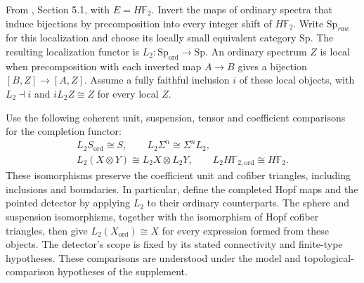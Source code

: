 \begin{definition}
\label{sem:AdamsSynthetic:completed-background}
\label{sem:AdamsSynthetic:completion-comparisons}
From \cite{Pst}, Section 5.1, with $E=H\mathbb F_2$. Invert the maps
of ordinary spectra that induce bijections by precomposition into every
integer shift of $H\mathbb F_2$. Write $\mathrm{Sp}_{raw}$ for this
localization and choose its locally small equivalent category
$\mathrm{Sp}$. The resulting localization functor is
$L_2:\mathrm{Sp}_{\mathrm{ord}}\to\mathrm{Sp}$.
An ordinary spectrum $Z$ is local when precomposition with each
inverted map $A\to B$ gives a bijection $[B,Z]\to[A,Z]$.
Assume a fully faithful inclusion $i$ of these local objects, with
$L_2\dashv i$ and $iL_2Z\cong Z$ for every local $Z$.

Use the following coherent unit, suspension, tensor and coefficient
comparisons for the completion functor:
\[
 \begin{gathered}
 L_2S_{\mathrm{ord}}\cong S,\qquad
 L_2\Sigma^n\cong\Sigma^nL_2,\\
 L_2(X\otimes Y)\cong L_2X\otimes L_2Y,\qquad
 L_2H\mathbb F_{2,\mathrm{ord}}\cong H\mathbb F_2.
 \end{gathered}
\]
These isomorphisms preserve the coefficient unit and cofiber triangles,
including inclusions and boundaries. In particular, define the completed
Hopf maps and the pointed detector by applying $L_2$ to their ordinary
counterparts. The sphere and suspension isomorphisms, together with the
isomorphism of Hopf cofiber triangles, then give
$L_2(X_{\mathrm{ord}})\cong X$ for every expression formed from these
objects. The detector's scope is fixed by its stated connectivity and finite-type hypotheses.
These comparisons are understood under the model and
topological-comparison hypotheses of the supplement.
\end{definition}

